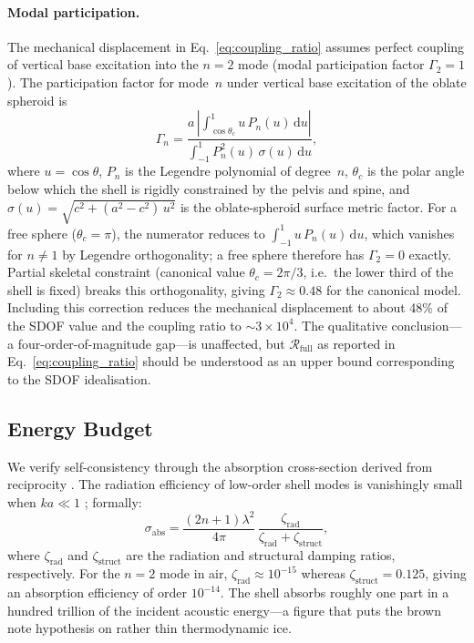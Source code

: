 \paragraph{Modal participation.}
The mechanical displacement in Eq.~\eqref{eq:coupling_ratio} assumes perfect
coupling of vertical base excitation into the $n=2$ mode (modal participation
factor $\Gamma_2 = 1$).  The participation factor for mode~$n$ under vertical
base excitation of the oblate spheroid is
\begin{equation}
  \Gamma_n
  = \frac{a\,\displaystyle\left|\int_{\cos\theta_c}^{1}
      u\,P_n(u)\,\mathrm{d}u\right|}
    {\displaystyle\int_{-1}^{1}
      P_n^{2}(u)\,\sigma(u)\,\mathrm{d}u},
  \label{eq:participation_factor}
\end{equation}
where $u = \cos\theta$, $P_n$ is the Legendre polynomial of degree~$n$,
$\theta_c$ is the polar angle below which the shell is rigidly constrained
by the pelvis and spine, and
$\sigma(u) = \sqrt{c^{2} + (a^{2}-c^{2})\,u^{2}}$
is the oblate-spheroid surface metric factor.
For a free sphere ($\theta_c = \pi$), the numerator reduces to
$\int_{-1}^{1} u\,P_n(u)\,\mathrm{d}u$, which vanishes for $n \neq 1$ by
Legendre orthogonality; a free sphere therefore has $\Gamma_2 = 0$ exactly.
Partial skeletal constraint (canonical value $\theta_c = 2\pi/3$, i.e.\ the
lower third of the shell is fixed) breaks this orthogonality, giving
$\Gamma_2 \approx 0.48$ for the canonical model.  Including this correction
reduces the mechanical displacement to about 48\% of the SDOF value and the
coupling ratio to $\sim 3 \times 10^4$.  The qualitative conclusion---a
four-order-of-magnitude gap---is unaffected, but $\mathcal{R}_\mathrm{full}$ as reported in
Eq.~\eqref{eq:coupling_ratio} should be understood as an upper bound
corresponding to the SDOF idealisation.

\subsection{Energy Budget}

We verify self-consistency through the absorption cross-section derived from
reciprocity \cite{Junger1986,Godin2023}.  The radiation efficiency of
low-order shell modes is vanishingly small when $ka \ll 1$
\cite{FahyGardonio2007}; formally:
\begin{equation}
  \sigma_\mathrm{abs} = \frac{(2n+1)\lambda^2}{4\pi}
  \,\frac{\zeta_\mathrm{rad}}{\zeta_\mathrm{rad} + \zeta_\mathrm{struct}},
\end{equation}
where $\zeta_\mathrm{rad}$ and $\zeta_\mathrm{struct}$ are the radiation and
structural damping ratios, respectively.  For the $n=2$ mode in air,
$\zeta_\mathrm{rad} \approx 10^{-15}$ whereas
$\zeta_\mathrm{struct} = 0.125$, giving an absorption efficiency of order
$10^{-14}$.  The shell absorbs roughly one part in a hundred trillion of
the incident acoustic energy---a figure that puts the brown note hypothesis
on rather thin thermodynamic ice.

